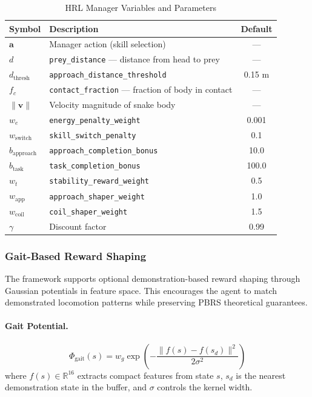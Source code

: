 \documentclass[11pt]{article}
\begin{document}
\begin{table}[H]
\centering
\caption{HRL Manager Variables and Parameters}
\begin{tabular}{@{}llc@{}}
\toprule
\textbf{Symbol} & \textbf{Description} & \textbf{Default} \\
\midrule
$\mathbf{a}$ & Manager action (skill selection) & --- \\
$d$ & \texttt{prey\_distance} --- distance from head to prey & --- \\
$d_{\text{thresh}}$ & \texttt{approach\_distance\_threshold} & 0.15 m \\
$f_c$ & \texttt{contact\_fraction} --- fraction of body in contact & --- \\
$\|\mathbf{v}\|$ & Velocity magnitude of snake body & --- \\
$w_e$ & \texttt{energy\_penalty\_weight} & 0.001 \\
$w_{\text{switch}}$ & \texttt{skill\_switch\_penalty} & 0.1 \\
$b_{\text{approach}}$ & \texttt{approach\_completion\_bonus} & 10.0 \\
$b_{\text{task}}$ & \texttt{task\_completion\_bonus} & 100.0 \\
$w_t$ & \texttt{stability\_reward\_weight} & 0.5 \\
$w_{\text{app}}$ & \texttt{approach\_shaper\_weight} & 1.0 \\
$w_{\text{coil}}$ & \texttt{coil\_shaper\_weight} & 1.5 \\
$\gamma$ & Discount factor & 0.99 \\
\bottomrule
\end{tabular}
\end{table}

\subsubsection{Gait-Based Reward Shaping}

The framework supports optional demonstration-based reward shaping through Gaussian potentials in feature space. This encourages the agent to match demonstrated locomotion patterns while preserving PBRS theoretical guarantees.

\paragraph{Gait Potential.}
\begin{equation}
    \Phi_{\text{gait}}(s) = w_g \exp\left(-\frac{\|f(s) - f(s_d)\|^2}{2\sigma^2}\right)
\end{equation}
where $f(s) \in \mathbb{R}^{16}$ extracts compact features from state $s$, $s_d$ is the nearest demonstration state in the buffer, and $\sigma$ controls the kernel width.
\end{document}
